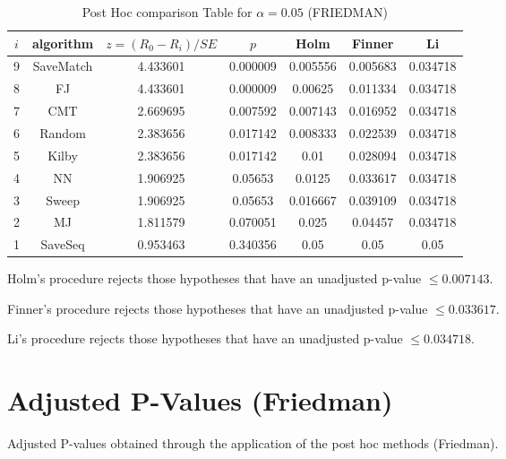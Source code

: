 \documentclass[a4paper,10pt]{article}
\begin{document}
\begin{landscape}
\begin{table}[!htp]
\centering\footnotesize
\begin{tabular}{ccccccc}
$i$&algorithm&$z=(R_0 - R_i)/SE$&$p$&Holm &Finner&Li\\
\hline9&SaveMatch&4.433601&0.000009&0.005556&0.005683&0.034718\\8&FJ&4.433601&0.000009&0.00625&0.011334&0.034718\\7&CMT&2.669695&0.007592&0.007143&0.016952&0.034718\\6&Random&2.383656&0.017142&0.008333&0.022539&0.034718\\5&Kilby&2.383656&0.017142&0.01&0.028094&0.034718\\4&NN&1.906925&0.05653&0.0125&0.033617&0.034718\\3&Sweep&1.906925&0.05653&0.016667&0.039109&0.034718\\2&MJ&1.811579&0.070051&0.025&0.04457&0.034718\\1&SaveSeq&0.953463&0.340356&0.05&0.05&0.05\\\hline
\end{tabular}
\caption{Post Hoc comparison Table for $\alpha=0.05$ (FRIEDMAN)}
\end{table}Holm's procedure rejects those hypotheses that have an unadjusted p-value $\le0.007143$.

Finner's procedure rejects those hypotheses that have an unadjusted p-value $\le0.033617$.

Li's procedure rejects those hypotheses that have an unadjusted p-value $\le0.034718$.


\newpage

\section{Adjusted P-Values (Friedman)}


Adjusted P-values obtained through the application of the post hoc methods (Friedman).


\end{landscape}
\end{document}
